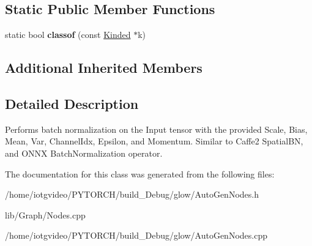 \subsection*{Static Public Member Functions}
\begin{DoxyCompactItemize}
\item 
\mbox{\label{classglow_1_1_batch_normalization_node_a23183c6fbf2e95c830a81afc073ce728}} 
static bool {\bfseries classof} (const \hyperlink{classglow_1_1_kinded}{Kinded} $\ast$k)
\end{DoxyCompactItemize}
\subsection*{Additional Inherited Members}


\subsection{Detailed Description}
Performs batch normalization on the Input tensor with the provided Scale, Bias, Mean, Var, Channel\+Idx, Epsilon, and Momentum. Similar to Caffe2 Spatial\+BN, and O\+N\+NX Batch\+Normalization operator. 

The documentation for this class was generated from the following files\+:\begin{DoxyCompactItemize}
\item 
/home/iotgvideo/\+P\+Y\+T\+O\+R\+C\+H/build\+\_\+\+Debug/glow/Auto\+Gen\+Nodes.\+h\item 
lib/\+Graph/Nodes.\+cpp\item 
/home/iotgvideo/\+P\+Y\+T\+O\+R\+C\+H/build\+\_\+\+Debug/glow/Auto\+Gen\+Nodes.\+cpp\end{DoxyCompactItemize}

